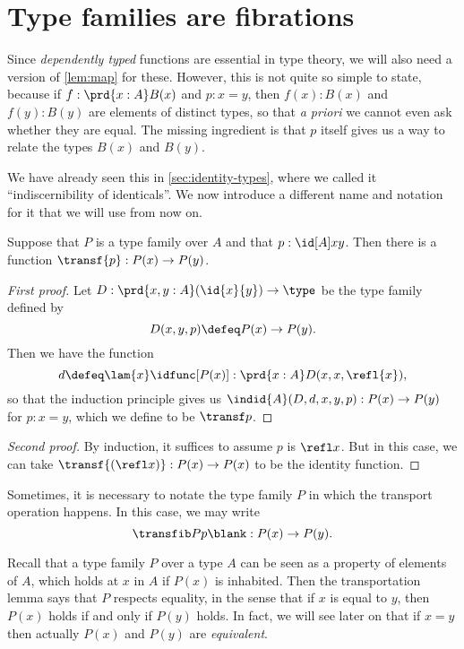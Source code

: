 \section{Type families are fibrations}
\label{sec:fibrations}

%
%
Since \emph{dependently typed} functions are essential in type theory, we will also need a version of \cref{lem:map} for these.
However, this is not quite so simple to state, because if $f:\prd{x:A} B(x)$ and $p:x=y$, then $f(x):B(x)$ and $f(y):B(y)$ are elements of distinct types, so that \emph{a priori} we cannot even ask whether they are equal.
The missing ingredient is that $p$ itself gives us a way to relate the types $B(x)$ and $B(y)$.

We have already seen this in \autoref{sec:identity-types}, where we called it ``indiscernibility of identicals''.
%
We now introduce a different name and notation for it that we will use from now on.

\begin{lem}[Transport]\label{lem:transport}
  Suppose that $P$ is a type family over $A$ and that $p:\id[A]xy$.
  Then there is a function $\transf{p}:P(x)\to P(y)$.
\end{lem}

\begin{proof}[First proof]
  Let $D:\prd{x,y:A} (\id{x}{y}) \to \type$ be the type family defined by
  \[D(x,y,p)\defeq P(x)\to P(y).\]
  Then we have the function
  \begin{equation*}
    d\defeq\lam{x} \idfunc[P(x)]:\prd{x:A} D(x,x,\refl{x}),
  \end{equation*}
  so that the induction principle gives us $\indid{A}(D,d,x,y,p):P(x)\to P(y)$ for $p:x= y$, which we define to be $\transf p$.
\end{proof}

\begin{proof}[Second proof]
  By induction, it suffices to assume $p$ is $\refl x$.
  But in this case, we can take $\transf{(\refl x)}:P(x)\to P(x)$ to be the identity function.
\end{proof}

Sometimes, it is necessary to notate the type family $P$ in which the transport operation happens.
In this case, we may write
\[\transfib P p \blank : P(x) \to P(y).\]

Recall that a type family $P$ over a type $A$ can be seen as a property of elements of $A$, which holds at $x$ in $A$ if $P(x)$ is inhabited.
Then the transportation lemma says that $P$ respects equality, in the sense that if $x$ is equal to $y$, then $P(x)$ holds if and only if $P(y)$ holds.
In fact, we will see later on that if $x=y$ then actually $P(x)$ and $P(y)$ are \emph{equivalent}.

